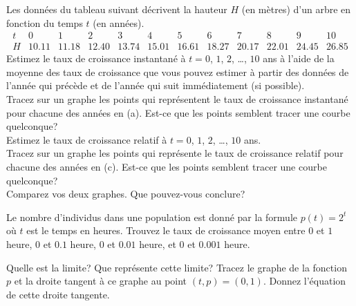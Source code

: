 \begin{question}[\life]
Les données du tableau suivant décrivent la hauteur $H$ (en mètres) d'un
arbre en fonction du temps $t$ (en années).
\[
\begin{array}{c|ccccccccccc}
t & 0 & 1 & 2 & 3 & 4 & 5 & 6 & 7 & 8 & 9 & 10 \\
\hline
H & 10.11 & 11.18 & 12.40 & 13.74 & 15.01 & 16.61 & 18.27 &
20.17 & 22.01 & 24.45 & 26.85
\end{array}
\]
 Estimez le taux de croissance instantané à $t=0$, $1$, $2$,
\ldots, $10$ ans à l'aide de la moyenne des taux de croissance que
vous pouvez estimer à partir des données de l'année qui précède et de
l'année qui suit immédiatement (si possible).\\
 Tracez sur un graphe les points qui représentent le taux de
croissance instantané pour chacune des années en (a).  Est-ce que les
points semblent tracer une courbe quelconque?\\
 Estimez le taux de croissance relatif à $t=0$, $1$, $2$,
\ldots, $10$ ans.\\
 Tracez sur un graphe les points qui représente le taux de
croissance relatif pour chacune des années en (c).  Est-ce que les
points semblent tracer une courbe quelconque?\\
 Comparez vos deux graphes.  Que pouvez-vous conclure?
\label{5Q3}
\end{question}

\begin{question}[\life]
Le nombre d'individus dans une population est donné par la formule
$p(t) = 2^t$ où $t$ est le temps en heures. Trouvez le taux de
croissance moyen entre $0$ et $1$ heure, $0$ et $0.1$ heure, $0$ et
$0.01$ heure, et $0$ et $0.001$ heure.

Quelle est la limite?  Que représente cette limite?  Tracez le graphe
de la fonction $p$ et la droite tangent à ce graphe au point
$(t,p) = (0,1)$.  Donnez l'équation de cette droite tangente.
\label{5Q4}
\end{question}

